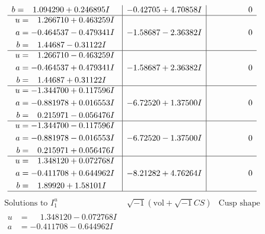 \documentclass[1p]{elsarticle_modified}
\theoremstyle{definition}
\newcommand{\I}{\sqrt{-1}}
\begin{document}
$$\begin{array}{c|c|c}
\begin{aligned}
b &= \phantom{-}1.094290 + 0.246895 I\end{aligned}
 & -0.42705 + 4.70858 I & \phantom{-0.000000 } 0 \\ \hline\begin{aligned}
u &= \phantom{-}1.266710 + 0.463259 I \\
a &= -0.464537 - 0.479341 I \\
b &= \phantom{-}1.44687 - 0.31122 I\end{aligned}
 & -1.58687 - 2.36382 I & \phantom{-0.000000 } 0 \\ \hline\begin{aligned}
u &= \phantom{-}1.266710 - 0.463259 I \\
a &= -0.464537 + 0.479341 I \\
b &= \phantom{-}1.44687 + 0.31122 I\end{aligned}
 & -1.58687 + 2.36382 I & \phantom{-0.000000 } 0 \\ \hline\begin{aligned}
u &= -1.344700 + 0.117596 I \\
a &= -0.881978 + 0.016553 I \\
b &= \phantom{-}0.215971 - 0.056476 I\end{aligned}
 & -6.72520 + 1.37500 I & \phantom{-0.000000 } 0 \\ \hline\begin{aligned}
u &= -1.344700 - 0.117596 I \\
a &= -0.881978 - 0.016553 I \\
b &= \phantom{-}0.215971 + 0.056476 I\end{aligned}
 & -6.72520 - 1.37500 I & \phantom{-0.000000 } 0 \\ \hline\begin{aligned}
u &= \phantom{-}1.348120 + 0.072768 I \\
a &= -0.411708 + 0.644962 I \\
b &= \phantom{-}1.89920 + 1.58101 I\end{aligned}
 & -8.21282 + 4.76264 I & \phantom{-0.000000 } 0\\
 \hline 
 \end{array}$$\newpage$$\begin{array}{c|c|c}  
\text{Solutions to }I^u_{1}& \I (\text{vol} + \sqrt{-1}CS) & \text{Cusp shape}\\
 \hline 
\begin{aligned}
u &= \phantom{-}1.348120 - 0.072768 I \\
a &= -0.411708 - 0.644962 I \\

\end{aligned}
\end{array}$$
\end{document}
